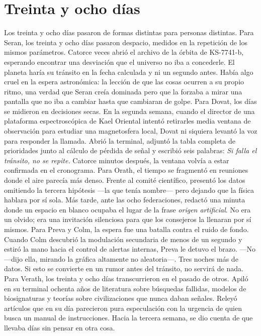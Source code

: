 \documentclass[11pt,a5paper,twoside]{book}
\begin{document}
\chapter{Treinta y ocho días}

Los treinta y ocho días pasaron de formas distintas para personas distintas.
Para Seran, los treinta y ocho días pasaron despacio, medidos en la repetición de los mismos parámetros. Catorce veces abrió el archivo de la órbita de KS-7741-b, esperando encontrar una desviación que el universo no iba a concederle. El planeta haría su tránsito en la fecha calculada y ni un segundo antes. Había algo cruel en la espera astronómica: la lección de que las cosas ocurren a su propio ritmo, una verdad que Seran creía dominada pero que la forzaba a mirar una pantalla que no iba a cambiar hasta que cambiaran de golpe.
Para Dovat, los días se midieron en decisiones secas. En la segunda semana, cuando el director de una plataforma espectroscópica de Kael Oriental intentó retirarles media ventana de observación para estudiar una magnetosfera local, Dovat ni siquiera levantó la voz para responder la llamada. Abrió la terminal, adjuntó la tabla completa de prioridades junto al cálculo de pérdida de señal y escribió seis palabras: \textit{Si falla el tránsito, no se repite.} Catorce minutos después, la ventana volvía a estar confirmada en el cronograma.
Para Orath, el tiempo se fragmentó en reuniones donde el aire parecía más denso. Frente al comité científico, presentó los datos omitiendo la tercera hipótesis —la que tenía nombre— pero dejando que la física hablara por sí sola. Más tarde, ante las ocho federaciones, redactó una minuta donde un espacio en blanco ocupaba el lugar de la frase \textit{origen artificial}. No era un olvido; era una invitación silenciosa para que los consejeros la llenaran por sí mismos.
Para Preva y Colm, la espera fue una batalla contra el ruido de fondo. Cuando Colm descubrió la modulación secundaria de menos de un segundo y estiró la mano hacia el control de alertas internas, Preva le detuvo el brazo.
—No —dijo ella, mirando la gráfica altamente no aleatoria—. Tres noches más de datos. Si esto se convierte en un rumor antes del tránsito, no servirá de nada.
Para Verath, los treinta y ocho días transcurrieron en el pasado de otros. Apiló en su terminal ochenta años de literatura sobre búsquedas fallidas, modelos de biosignaturas y teorías sobre civilizaciones que nunca daban señales. Releyó artículos que en su día parecieron pura especulación con la urgencia de quien busca un manual de instrucciones. Hacia la tercera semana, se dio cuenta de que llevaba días sin pensar en otra cosa.
\end{document}
